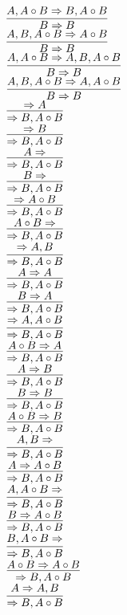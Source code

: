 \documentclass[11pt]{article}
\begin{document}
\begin{center}
\bigskip
\\$\infer{B\Rightarrow B}{A, A\circ B\Rightarrow B, A\circ B}$
\bigskip
\\$\infer{B\Rightarrow B}{A, B, A\circ B\Rightarrow A\circ B}$
\bigskip
\\$\infer{B\Rightarrow B}{A, A\circ B\Rightarrow A, B, A\circ B}$
\bigskip
\\$\infer{B\Rightarrow B}{A, B, A\circ B\Rightarrow A, A\circ B}$
\bigskip
\\$\infer{\Rightarrow B, A\circ B}{\Rightarrow A}$
\bigskip
\\$\infer{\Rightarrow B, A\circ B}{\Rightarrow B}$
\bigskip
\\$\infer{\Rightarrow B, A\circ B}{A\Rightarrow }$
\bigskip
\\$\infer{\Rightarrow B, A\circ B}{B\Rightarrow }$
\bigskip
\\$\infer{\Rightarrow B, A\circ B}{\Rightarrow A\circ B}$
\bigskip
\\$\infer{\Rightarrow B, A\circ B}{A\circ B\Rightarrow }$
\bigskip
\\$\infer{\Rightarrow B, A\circ B}{\Rightarrow A, B}$
\bigskip
\\$\infer{\Rightarrow B, A\circ B}{A\Rightarrow A}$
\bigskip
\\$\infer{\Rightarrow B, A\circ B}{B\Rightarrow A}$
\bigskip
\\$\infer{\Rightarrow B, A\circ B}{\Rightarrow A, A\circ B}$
\bigskip
\\$\infer{\Rightarrow B, A\circ B}{A\circ B\Rightarrow A}$
\bigskip
\\$\infer{\Rightarrow B, A\circ B}{A\Rightarrow B}$
\bigskip
\\$\infer{\Rightarrow B, A\circ B}{B\Rightarrow B}$
\bigskip
\\$\infer{\Rightarrow B, A\circ B}{A\circ B\Rightarrow B}$
\bigskip
\\$\infer{\Rightarrow B, A\circ B}{A, B\Rightarrow }$
\bigskip
\\$\infer{\Rightarrow B, A\circ B}{A\Rightarrow A\circ B}$
\bigskip
\\$\infer{\Rightarrow B, A\circ B}{A, A\circ B\Rightarrow }$
\bigskip
\\$\infer{\Rightarrow B, A\circ B}{B\Rightarrow A\circ B}$
\bigskip
\\$\infer{\Rightarrow B, A\circ B}{B, A\circ B\Rightarrow }$
\bigskip
\\$\infer{\Rightarrow B, A\circ B}{A\circ B\Rightarrow A\circ B}$
\bigskip
\\$\infer{\Rightarrow B, A\circ B}{A\Rightarrow A, B}$

\end{center}
\end{document}
